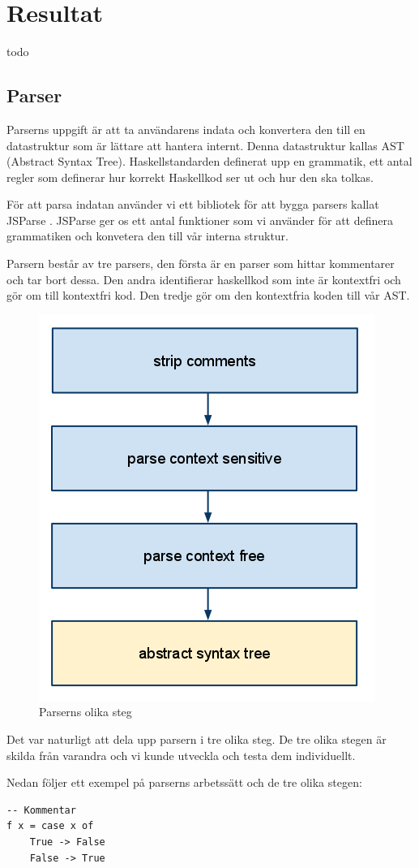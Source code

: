 \section{Resultat}
todo


\subsection{Parser} 
Parserns uppgift är att ta användarens indata och konvertera den till en datastruktur 
som är lättare att hantera internt. Denna datastruktur kallas AST (Abstract Syntax Tree). 
Haskellstandarden definerat upp en grammatik, ett antal regler som definerar hur korrekt Haskellkod ser ut och hur den ska tolkas.

För att parsa indatan använder vi ett bibliotek för att bygga parsers kallat JSParse \citep{jsparse}.
JSParse ger os ett antal funktioner som vi använder för att definera grammatiken och konvetera den till vår interna struktur.

Parsern består av tre parsers, den första är en parser som hittar kommentarer och tar bort dessa. 
Den andra identifierar haskellkod som inte är kontextfri och gör om till kontextfri kod. Den tredje gör om den kontextfria koden till vår AST.

\begin{figure}[H]
    \begin{center}
        \includegraphics[width=.5\textwidth]{parser_1.png}
        \caption{Parserns olika steg}
    \end{center}
\end{figure}

Det var naturligt att dela upp parsern i tre olika steg. De tre olika stegen är skilda från varandra och vi kunde utveckla och testa dem individuellt.

Nedan följer ett exempel på parserns arbetssätt och de tre olika stegen:
\begin{lstlisting}
-- Kommentar
f x = case x of
    True -> False
    False -> True
\end{lstlisting}

